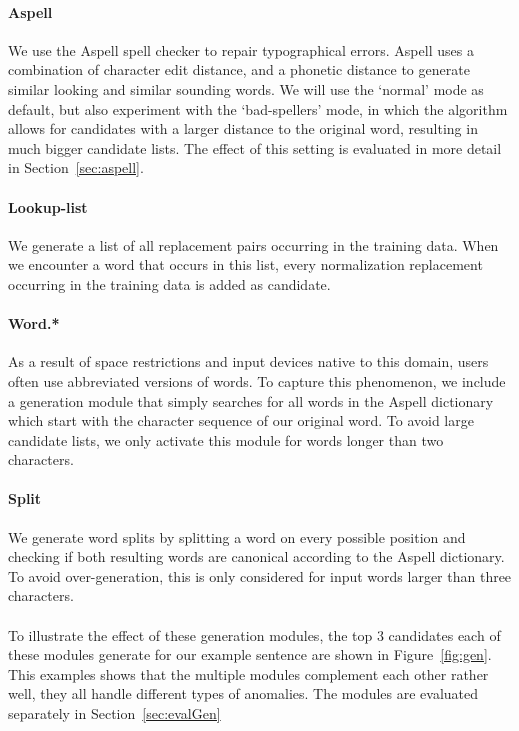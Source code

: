 \documentclass[a4paper,10pt,twoside]{article}
\begin{document}
\paragraph{Aspell} 
We use the Aspell spell checker to repair typographical
errors. Aspell uses a combination of character edit distance, and a phonetic distance to generate similar looking and similar sounding words.  We will use
the `normal' mode as default, but also experiment with the `bad-spellers' mode,
in which the algorithm allows for candidates with a larger distance to the
original word, resulting in much bigger candidate lists. The effect of this
setting is evaluated in more detail in Section~\ref{sec:aspell}.

\paragraph{Lookup-list}
We generate a list of all replacement pairs occurring in the training data.
When we encounter a word that occurs in this list, every normalization
replacement occurring in the training data is added as candidate.

\paragraph{Word.*} 
As a result of space restrictions and input devices native to this domain,
users often use abbreviated versions of words. To capture this
phenomenon, we include a generation module that simply searches for all words
in the Aspell dictionary which start with the character sequence of our
original word. To avoid large candidate lists, we only activate this module for
words longer than two characters.

\paragraph{Split}
We generate word splits by splitting a word on every possible position
and checking if both resulting words are canonical according to the Aspell
dictionary.  To avoid over-generation, this is only considered for input words
larger than three characters.
\\
\\
To illustrate the effect of these generation modules, the top 3 candidates each
of these modules generate for our example sentence are shown in
Figure~\ref{fig:gen}.  This examples shows that the multiple modules complement
each other rather well, they all handle different types of anomalies.  The
modules are evaluated separately in Section~\ref{sec:evalGen}
\end{document}
